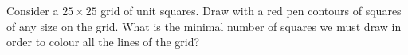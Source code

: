 Consider a $25 \times 25$ grid of unit squares. Draw with a red pen contours of squares of any size on the grid. What is the minimal number of squares we must draw in order to colour all the lines of the grid?